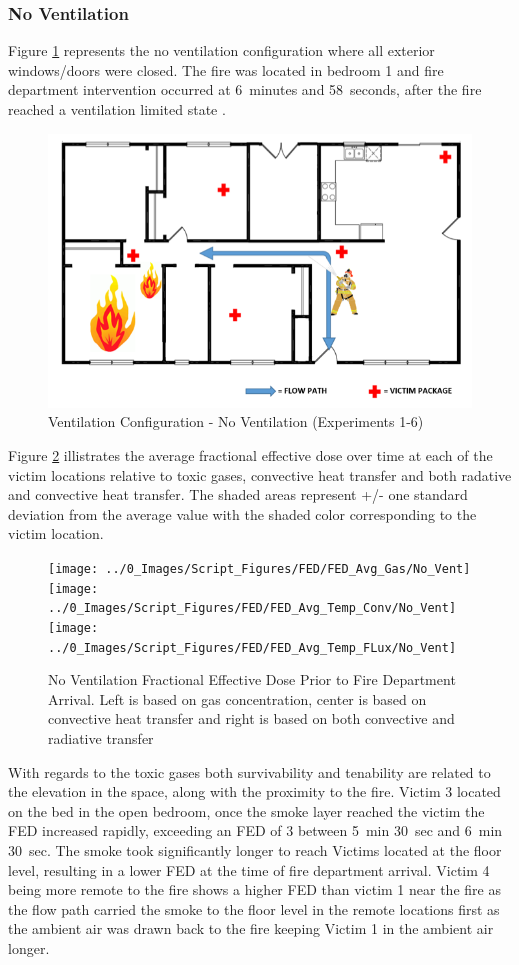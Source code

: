 \documentclass[12pt,oneside]{book}
\begin{document}
\subsubsection{No Ventilation}

Figure \ref{fig:Vent_Profile-No_Vent} represents the no ventilation configuration where all exterior windows/doors were closed. The fire was located in bedroom 1 and fire department intervention occurred at 6~minutes and 58~seconds, after the fire reached a ventilation limited state . 

\begin{figure}[H]
	\centering
	\includegraphics[width=.65\textwidth]{../0_Images/Ventilation_Configurations/No_Vent.png}
	\caption{Ventilation Configuration - No Ventilation (Experiments 1-6)}
	\label{fig:Vent_Profile-No_Vent}
\end{figure}

 Figure \ref{fig:FED_NoVent} illistrates the average fractional effective dose over time at each of the victim locations relative to toxic gases, convective heat transfer and both radative and convective heat transfer. The shaded areas represent +/- one standard deviation from the average value with the shaded color corresponding to the victim location. 

\begin{figure}[H]
	\centering
	\texttt{[image: ../0\_Images/Script\_Figures/FED/FED\_Avg\_Gas/No\_Vent]}
	\texttt{[image: ../0\_Images/Script\_Figures/FED/FED\_Avg\_Temp\_Conv/No\_Vent]} 
	\texttt{[image: ../0\_Images/Script\_Figures/FED/FED\_Avg\_Temp\_FLux/No\_Vent]}
	\caption[No Vent Fractional Effective Dose]{No Ventilation Fractional Effective Dose Prior to Fire Department Arrival. Left is based on gas concentration, center is based on convective heat transfer and right is based on both convective and radiative transfer}
	\label{fig:FED_NoVent}
\end{figure}

With regards to the toxic gases both survivability and tenability are related to the elevation in the space, along with the proximity to the fire. Victim 3 located on the bed in the open bedroom, once the smoke layer reached the victim the FED increased rapidly, exceeding an FED of 3 between 5~min 30~sec and 6~min 30~sec. The smoke took significantly longer to reach Victims located at the floor level, resulting in a lower FED at the time of fire department arrival. Victim 4 being more remote to the fire shows a higher FED than victim 1 near the fire as the flow path carried the smoke to the floor level in the remote locations first as the ambient air was drawn back to the fire keeping Victim 1 in the ambient air longer. 
\end{document}
